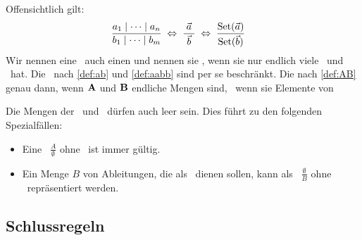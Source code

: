 Offensichtlich gilt:
\begin{align}
	& \frac{a_1 \srand \dots \srand a_n}{b_1 \srand \dots \srand b_m} \; \metaequiv \; \frac{\; \vec{a} \;}{\; \vec{b} \;} \; \metaequiv \; \frac{\Set(\vec{a})}{\Set(\vec{b})} \label{eq:AB}
\end{align}
Wir nennen eine \Schlussregel\ auch einen  und nennen sie , wenn sie nur endlich viele \Voraussetzungen\ und \Folgerungen\ hat.
Die \Schlussregeln\ nach \eqref{def:ab} und \eqref{def:aabb} sind per se beschränkt.
Die nach \eqref{def:AB} genau dann, wenn $\mathbf{A}$ und $\mathbf{B}$ endliche Mengen sind, \textdh\ wenn sie Elemente von

Die Mengen der \Voraussetzungen\ und \Folgerungen\ dürfen auch leer sein.
Dies führt zu den folgenden Spezialfällen:
\begin{itemize}
	\item[] Eine \Schlussregel\ $\frac{A}{\emptyset}$ ohne \Folgerungen\ ist immer gültig.
	\item[] Ein Menge $B$ von Ableitungen, die als \Axiome\ dienen sollen, kann als \Schlussregel\ $\frac{\emptyset}{B}$ ohne \Voraussetzungen\ repräsentiert werden.
\end{itemize}

\subsection{Schlussregeln}%
\label{sub:Schlussregeln}


